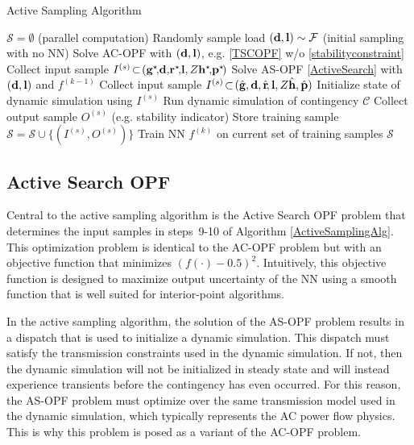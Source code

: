 \documentclass[lettersize,journal]{IEEEtran}
\begin{document}
\begin{algorithm}[t]
\caption{Active Sampling Algorithm} \label{ActiveSamplingAlg}
\begin{algorithmic}[1]
\State $\mathcal{S}=\emptyset$
 (parallel computation)\label{line:InputSamples}
\State Randomly sample load $(\bold{d},\bold{l})\sim\mathcal{F}$
 (initial sampling with no NN)
    \State Solve AC-OPF with $(\bold{d},\bold{l})$, e.g. \eqref{TSCOPF} w/o \eqref{stabilityconstraint}   
    \State Collect input sample $I^{(s)}\!\subset\!(\bold{g}^{\star}\!,\!\bold{d},\!\bold{r}^{\star}\!,\!\bold{l},Z\bold{h}^{\star}\!,\!\bold{p}^{\star}\!)$
\Else
    \State Solve AS-OPF \eqref{ActiveSearch} with $(\bold{d},\bold{l})$ and $f^{(k-1)}$
    \State Collect input sample $I^{(s)}\!\subset\!(\hat{\bold{g}},\bold{d},\hat{\bold{r}}\!,\bold{l},Z\hat{\bold{h}},\hat{\bold{p}})$
\EndIf
\State Initialize state of dynamic simulation using $I^{(s)}$
\State Run dynamic simulation of contingency $\mathcal{C}$
\State Collect output sample $O^{(s)}$ (e.g. stability indicator)
\State Store training sample $\mathcal{S}=\mathcal{S}\cup \{(I^{(s)},O^{(s)})\}$
\EndFor
\State Train NN $f^{(k)}$ on current set of training samples $\mathcal{S}$
\label{line:initialization_decay_mu}
\EndFor
\end{algorithmic}
\end{algorithm}

\subsection{Active Search OPF}\label{sec:ASOPF}
Central to the active sampling algorithm is the Active Search OPF problem that determines the input samples in \mbox{steps 9-10} of Algorithm \ref{ActiveSamplingAlg}.  This optimization problem is identical to the AC-OPF problem but with an objective function that minimizes $(f(\cdot)-0.5)^2$.  Intuitively, this objective function is designed to maximize output uncertainty of the NN using a smooth function that is well suited for interior-point algorithms.  

In the active sampling algorithm, the solution of the AS-OPF problem results in a dispatch that is used to initialize a dynamic simulation.  This dispatch must satisfy the transmission constraints used in the dynamic simulation.  If not, then the dynamic simulation will not be initialized in steady state and will instead experience transients before the contingency has even occurred.  For this reason, the AS-OPF problem must optimize over the same transmission model used in the dynamic simulation, which typically represents the AC power flow physics.  This is why this problem is posed as a variant of the AC-OPF problem.  
\end{document}
